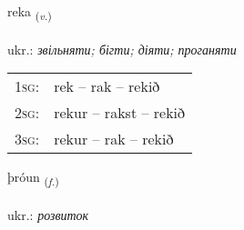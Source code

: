 \documentclass[frontgrid, backgrid]{flacards}\usepackage[]{graphicx}\usepackage[]{xcolor}
\begin{document}
\renewcommand{\flhead}{\vskip5pt \fboxsep=0pt {\small\bfseries\footnotesize Sagnorð | дієслово}}
\renewcommand{\fcfoot}{\vskip5pt \fboxsep=0pt \hspace{2pt}{\small\bfseries\footnotesize 1K}}

\renewcommand{\blhead}{\vskip5pt {\small\bfseries\footnotesize Sagnorð | дієслово }}
\renewcommand{\bcfoot}{\vskip5pt \hspace{2pt}{\small\bfseries\footnotesize 1K}}


{reka \small{\textsubscript{(\textit{v.})}} \\[1ex] %
\textphonetic{[rɛːka]} \\
ukr.: \emph{звільняти; бігти; діяти; проганяти} \\  [2ex]
\renewcommand*{\arraystretch}{0.8}
\begin{tabular}{p{1cm}l}
\textsc{1sg}: & rek -- rak -- rekið \\ 
\textsc{2sg}: & rekur -- rakst -- rekið \\ 
\textsc{3sg}: & rekur -- rak -- rekið \\ 
\end{tabular}
}

\renewcommand{\flhead}{\vskip5pt \fboxsep=0pt {\small\bfseries\footnotesize Nafnorð | іменник}}
\renewcommand{\fcfoot}{\vskip5pt \fboxsep=0pt \hspace{2pt}{\small\bfseries\footnotesize 1K}}

\renewcommand{\blhead}{\vskip5pt {\small\bfseries\footnotesize Nafnorð | іменник }}
\renewcommand{\bcfoot}{\vskip5pt \hspace{2pt}{\small\bfseries\footnotesize 1K}}


{þróun \small{\textsubscript{(\textit{f.})}} \\[1ex] %
\textphonetic{[θrouːʏn]} \\
ukr.: \emph{розвиток} \\  [2ex]
\renewcommand*{\arraystretch}{0.8}
}
\end{document}
